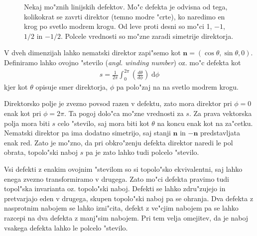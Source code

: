 \documentclass[a4paper,10pt]{article}
\renewcommand{\vec}{\mathbf}
\newcommand{\angl}[1]{(\textit{angl. #1})}
\newcommand{\dd}{\ensuremath{\;\mathrm{d}}}
\begin{document}
\begin{figure}[h]
 \centering
 \caption{Nekaj mo"znih linijskih defektov. Mo"c defekta je odvisna od tega, kolikokrat se zavrti direktor (temno modre "crte), ko naredimo en krog po svetlo modrem krogu. Od leve proti desni so mo"ci 1, $-1$, $1/2$ in $-1/2$. Polcele vrednosti so mo"zne zaradi simetrije direktorja. }
\end{figure}

V dveh dimenzijah lahko nematski direktor zapi"semo kot $\vec n = (\cos\theta, \sin\theta, 0)$. 
Definiramo lahko ovojno "stevilo \angl{winding number} oz. mo"c defekta kot
\begin{align}
\label{eq:winding-number}
 s = \frac{1}{2\pi}\int_0^{2\pi} \left(\frac{d\theta}{d\phi}\right) \dd \phi
\end{align}
kjer kot $\theta$ opisuje smer direktorja, $\phi$ pa polo"zaj na na svetlo modrem krogu. 

Direktorsko polje je zvezno povsod razen v defektu, zato mora direktor pri $\phi = 0$ enak kot pri $\phi = 2\pi$. 
Ta pogoj dolo"ca mo"zne vrednosti za $s$. 
Za prava vektorska polja mora biti $s$ celo "stevilo, saj mora biti kot $\theta$ na koncu enak kot na za"cetku. 
Nematski direktor pa ima dodatno simetrijo, saj stanji $\vec n$ in $-\vec n$ predstavljata enak red. 
Zato je mo"zno, da pri obkro"zenju defekta direktor naredi le pol obrata, topolo"ski naboj $s$ pa je zato lahko tudi polcelo "stevilo. 

Vsi defekti z enakim ovojnim "stevilom so si topolo"sko ekvivalentni, saj lahko enega zvezno transformiramo v drugega. 
Zato mo"ci defekta pravimo tudi topol"ska invarianta oz. topolo"ski naboj. 
Defekti se lahko zdru"zujejo in pretvarjajo eden v drugega, skupen topolo"ski naboj pa se ohranja. 
Dva defekta z nasprotnim nabojem se lahko izni"cita, defekt z ve"cjim nabojem pa se lahko razcepi na dva defekta z manj"sim nabojem. 
Pri tem velja omejitev, da je naboj vsakega defekta lahko le polcelo "stevilo. 
\end{document}
